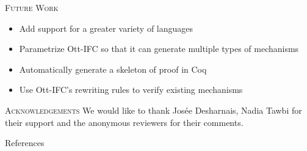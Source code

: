 \documentclass[final]{beamer}
\newlength{\onecolwid}
\begin{document}
\begin{frame}[fragile]
\begin{columns}[t]
\begin{column}{\onecolwid}
\begin{block}{\textsc{Future Work}}
    \begin{itemize}
        \item Add support for a greater variety of languages
        \item Parametrize Ott-IFC so that it can generate multiple types of mechanisms
        \item Automatically generate a skeleton of proof in Coq
        \item Use Ott-IFC's rewriting rules to verify existing mechanisms
    \end{itemize}
\end{block}

\begin{block}{\textsc{Acknowledgements}}
    We would like to thank Josée Desharnais, Nadia Tawbi for their support and the anonymous reviewers for their comments.    
\end{block}

\begin{block}{References}
    
    
\end{block}
\end{column}
\end{columns}
\end{frame}
\end{document}
